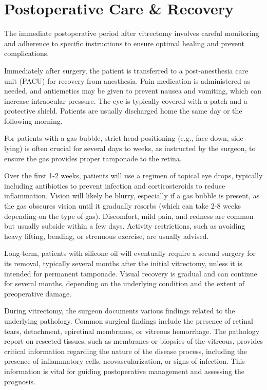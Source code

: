 \section*{Postoperative Care \& Recovery}
The immediate postoperative period after vitrectomy involves careful monitoring and adherence to specific instructions to ensure optimal healing and prevent complications. 

Immediately after surgery, the patient is transferred to a post-anesthesia care unit (PACU) for recovery from anesthesia. Pain medication is administered as needed, and antiemetics may be given to prevent nausea and vomiting, which can increase intraocular pressure. The eye is typically covered with a patch and a protective shield. Patients are usually discharged home the same day or the following morning. 

For patients with a gas bubble, strict head positioning (e.g., face-down, side-lying) is often crucial for several days to weeks, as instructed by the surgeon, to ensure the gas provides proper tamponade to the retina. 

Over the first 1-2 weeks, patients will use a regimen of topical eye drops, typically including antibiotics to prevent infection and corticosteroids to reduce inflammation. Vision will likely be blurry, especially if a gas bubble is present, as the gas obscures vision until it gradually resorbs (which can take 2-8 weeks depending on the type of gas). Discomfort, mild pain, and redness are common but usually subside within a few days. Activity restrictions, such as avoiding heavy lifting, bending, or strenuous exercise, are usually advised. 

Long-term, patients with silicone oil will eventually require a second surgery for its removal, typically several months after the initial vitrectomy, unless it is intended for permanent tamponade. Visual recovery is gradual and can continue for several months, depending on the underlying condition and the extent of preoperative damage.

During vitrectomy, the surgeon documents various findings related to the underlying pathology. Common surgical findings include the presence of retinal tears, detachment, epiretinal membranes, or vitreous hemorrhage. The pathology report on resected tissues, such as membranes or biopsies of the vitreous, provides critical information regarding the nature of the disease process, including the presence of inflammatory cells, neovascularization, or signs of infection. This information is vital for guiding postoperative management and assessing the prognosis.

